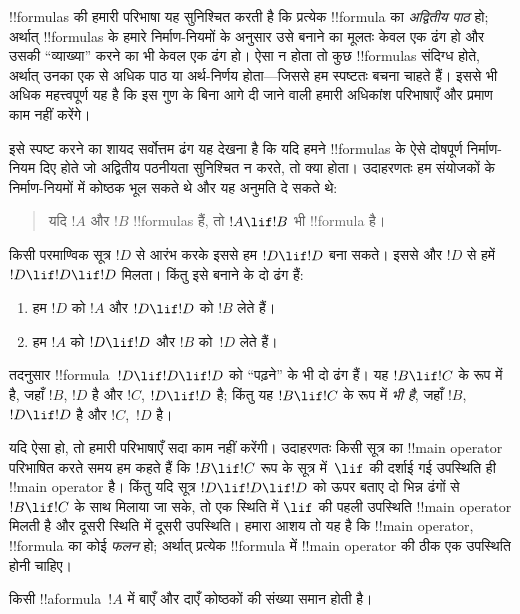 \documentclass[../../../include/open-logic-section]{subfiles}
\begin{document}


\begin{explain}
!!{formula}s की हमारी परिभाषा यह सुनिश्चित करती है कि प्रत्येक !!{formula}
का \emph{अद्वितीय पाठ} हो; अर्थात् !!{formula}s के हमारे निर्माण-नियमों के
अनुसार उसे बनाने का मूलतः केवल एक ढंग हो और उसकी ``व्याख्या'' करने का भी
केवल एक ढंग हो। ऐसा न होता तो कुछ !!{formula}s संदिग्ध होते, अर्थात् उनका
एक से अधिक पाठ या अर्थ-निर्णय होता---जिससे हम स्पष्टतः बचना चाहते हैं। इससे
भी अधिक महत्त्वपूर्ण यह है कि इस गुण के बिना आगे दी जाने वाली हमारी अधिकांश
परिभाषाएँ और प्रमाण काम नहीं करेंगे।

इसे स्पष्ट करने का शायद सर्वोत्तम ढंग यह देखना है कि यदि हमने !!{formula}s
के ऐसे दोषपूर्ण निर्माण-नियम दिए होते जो अद्वितीय पठनीयता सुनिश्चित न करते,
तो क्या होता। उदाहरणतः हम संयोजकों के निर्माण-नियमों में कोष्ठक भूल सकते थे
और यह अनुमति दे सकते थे:
\begin{quote}
यदि $!A$ और $!B$ !!{formula}s हैं, तो $!A \lif !B$ भी !!{formula} है।
\end{quote}
किसी परमाण्विक सूत्र $!D$ से आरंभ करके इससे हम $!D
\lif !D$ बना सकते। इससे और $!D$ से हमें $!D \lif !D
\lif !D$ मिलता। किंतु इसे बनाने के दो ढंग हैं:
\begin{enumerate}
\item हम $!D$ को $!A$ और $!D \lif !D$ को $!B$ लेते हैं।
\item हम $!A$ को $!D \lif !D$ और $!B$ को~$!D$ लेते हैं।
\end{enumerate}
तदनुसार !!{formula}~$!D \lif !D \lif !D$ को ``पढ़ने'' के भी दो ढंग हैं।
यह $!B
\lif !C$ के रूप में है, जहाँ $!B$, $!D$ है और $!C$, $!D \lif !D$
है; किंतु यह $!B \lif !C$ के रूप में \emph{भी है}, जहाँ $!B$,
$!D \lif !D$ है और $!C$,~$!D$ है।

यदि ऐसा हो, तो हमारी परिभाषाएँ सदा काम नहीं करेंगी। उदाहरणतः किसी सूत्र का
!!{main operator} परिभाषित करते समय हम कहते हैं कि $!B \lif !C$ रूप के सूत्र
में~$\lif$ की दर्शाई गई उपस्थिति ही !!{main operator} है। किंतु यदि सूत्र $!D
\lif !D \lif !D$ को ऊपर बताए दो भिन्न ढंगों से $!B \lif !C$ के साथ मिलाया
जा सके, तो एक स्थिति में $\lif$ की पहली उपस्थिति !!{main operator} मिलती है
और दूसरी स्थिति में दूसरी उपस्थिति। हमारा आशय तो यह है कि !!{main operator},
!!{formula} का कोई \emph{फलन} हो; अर्थात् प्रत्येक !!{formula} में
!!{main
  operator} की ठीक एक उपस्थिति होनी चाहिए।
\end{explain}

\begin{lem}
किसी !!a{formula}~$!A$ में बाएँ और दाएँ कोष्ठकों की संख्या समान होती है।
\end{lem}
\end{document}
